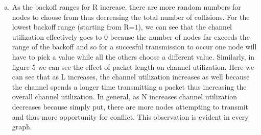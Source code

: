 \documentclass[11pt]{article}
\begin{document}
\begin{enumerate}[a.]
\item As the backoff ranges for R increase, there are more random numbers for nodes to choose from thus decreasing the total number of collisions. For the lowest backoff range (starting from R=$1$), we can see that the channel utilization effectively goes to $0$ because the number of nodes far exceeds the range of the backoff and so for a succesful transmission to occur one node will have to pick a value while all the others choose a different value. Similarly, in figure 5 we can see the effect of packet length on channel utilization. Here we can see that as L increases, the channel utilization increases as well because the channel spends a longer time transmitting a packet thus increasing the overall channel utilization. In general, as N increases channel utilization decreases because simply put, there are more nodes attempting to transmit and thus more opportunity for conflict. This observation is evident in every graph.


\end{enumerate}
\end{document}
